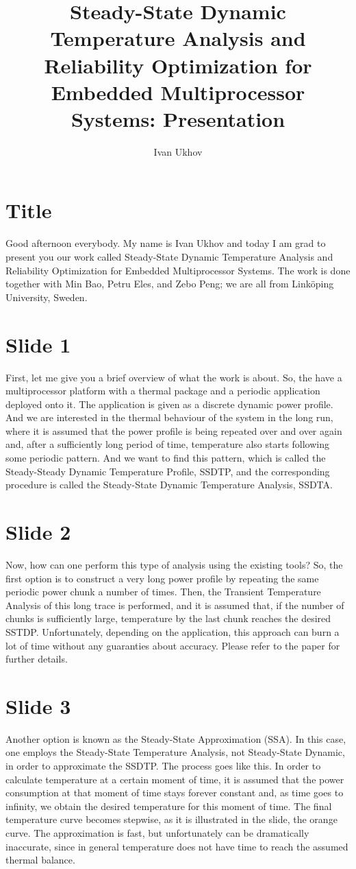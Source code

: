 \documentclass[11pt,a4paper]{article}
\title{Steady-State Dynamic Temperature Analysis and Reliability Optimization for Embedded Multiprocessor Systems: Presentation}
\author{Ivan Ukhov}
\begin{document}
\maketitle

\section{Title}
Good afternoon everybody. My name is Ivan Ukhov and today I am grad to present you our work called Steady-State Dynamic Temperature Analysis and Reliability Optimization for Embedded Multiprocessor Systems. The work is done together with Min Bao, Petru Eles, and Zebo Peng; we are all from Link\"{o}ping University, Sweden.

\section{Slide 1}
First, let me give you a brief overview of what the work is about. So, the have a multiprocessor platform with a thermal package and a periodic application deployed onto it. The application is given as a discrete dynamic power profile. And we are interested in the thermal behaviour of the system in the long run, where it is assumed that the power profile is being repeated over and over again and, after a sufficiently long period of time, temperature also starts following some periodic pattern. And we want to find this pattern, which is called the Steady-Steady Dynamic Temperature Profile, SSDTP, and the corresponding procedure is called the Steady-State Dynamic Temperature Analysis, SSDTA.

\section{Slide 2}
Now, how can one perform this type of analysis using the existing tools? So, the first option is to construct a very long power profile by repeating the same periodic power chunk a number of times. Then, the Transient Temperature Analysis of this long trace is performed, and it is assumed that, if the number of chunks is sufficiently large, temperature by the last chunk reaches the desired SSTDP. Unfortunately, depending on the application, this approach can burn a lot of time without any guaranties about accuracy. Please refer to the paper for further details.

\section{Slide 3}
Another option is known as the Steady-State Approximation (SSA). In this case, one employs the Steady-State Temperature Analysis, not Steady-State Dynamic, in order to approximate the SSDTP. The process goes like this. In order to calculate temperature at a certain moment of time, it is assumed that the power consumption at that moment of time stays forever constant and, as time goes to infinity, we obtain the desired temperature for this moment of time. The final temperature curve becomes stepwise, as it is illustrated in the slide, the orange curve. The approximation is fast, but unfortunately can be dramatically inaccurate, since in general temperature does not have time to reach the assumed thermal balance.
\end{document}

